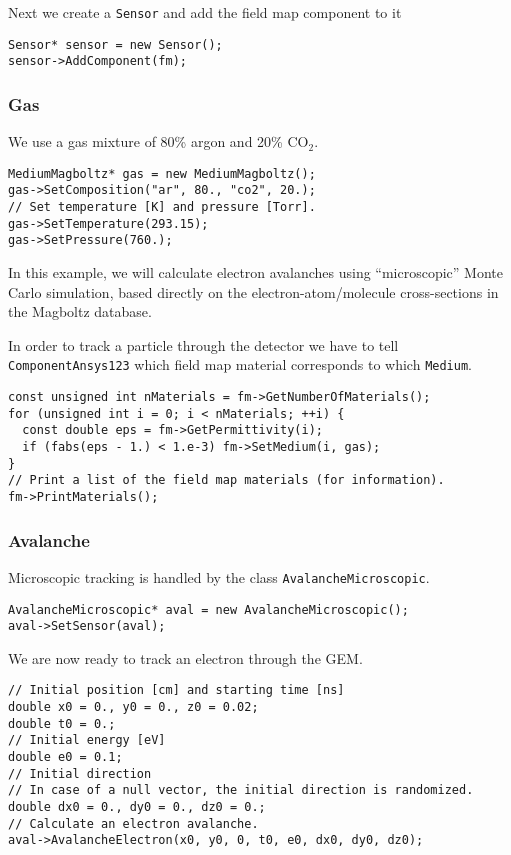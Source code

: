 Next we create a \texttt{Sensor} and add the field map 
component to it
\begin{lstlisting}
Sensor* sensor = new Sensor();
sensor->AddComponent(fm);
\end{lstlisting}

\subsubsection{Gas}

We use a gas mixture of 80\% argon and 20\% CO\(_{2}\).
\begin{lstlisting}
MediumMagboltz* gas = new MediumMagboltz();
gas->SetComposition("ar", 80., "co2", 20.);
// Set temperature [K] and pressure [Torr].
gas->SetTemperature(293.15);
gas->SetPressure(760.);
\end{lstlisting}

In this example, we will calculate electron avalanches using 
``microscopic'' Monte Carlo simulation, based directly on the 
electron-atom/molecule cross-sections in the Magboltz database. 
 

In order to track a particle through the detector we have to 
tell \texttt{ComponentAnsys123} which field map material corresponds 
to which \texttt{Medium}.
\begin{lstlisting}
const unsigned int nMaterials = fm->GetNumberOfMaterials();
for (unsigned int i = 0; i < nMaterials; ++i) {
  const double eps = fm->GetPermittivity(i);
  if (fabs(eps - 1.) < 1.e-3) fm->SetMedium(i, gas);
}
// Print a list of the field map materials (for information).
fm->PrintMaterials();
\end{lstlisting}

\subsubsection{Avalanche}

Microscopic tracking is handled by the class 
\texttt{AvalancheMicroscopic}.
\begin{lstlisting}
AvalancheMicroscopic* aval = new AvalancheMicroscopic();
aval->SetSensor(aval);
\end{lstlisting}
We are now ready to track an electron through the GEM.  
\begin{lstlisting}
// Initial position [cm] and starting time [ns]
double x0 = 0., y0 = 0., z0 = 0.02;
double t0 = 0.;
// Initial energy [eV]
double e0 = 0.1;
// Initial direction 
// In case of a null vector, the initial direction is randomized.
double dx0 = 0., dy0 = 0., dz0 = 0.;
// Calculate an electron avalanche.
aval->AvalancheElectron(x0, y0, 0, t0, e0, dx0, dy0, dz0);
\end{lstlisting}
